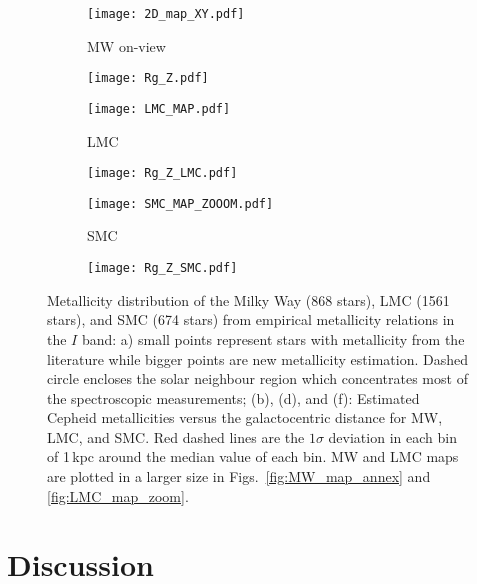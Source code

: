 \documentclass[article]{aa} %
\begin{document}
\begin{figure*} %
\begin{subfigure}{0.50\textwidth}
\texttt{[image: 2D\_map\_XY.pdf]}
\caption{MW on-view} \label{fig:MW_map}
\end{subfigure}\hspace*{\fill}
\begin{subfigure}{0.50\textwidth}
\texttt{[image: Rg\_Z.pdf]}
\caption{} \label{fig:grad_MW}
\end{subfigure}

\medskip
\begin{subfigure}{0.50\textwidth}
\texttt{[image: LMC\_MAP.pdf]}
\caption{LMC} \label{fig:LMC_map}
\end{subfigure}\hspace*{\fill}
\begin{subfigure}{0.50\textwidth}
\texttt{[image: Rg\_Z\_LMC.pdf]}
\caption{} \label{fig:LMC_grad}
\end{subfigure}

\medskip
\begin{subfigure}{0.50\textwidth}
\texttt{[image: SMC\_MAP\_ZOOOM.pdf]}
\caption{SMC} \label{fig:SMC_map}
\end{subfigure}\hspace*{\fill}
\begin{subfigure}{0.50\textwidth}
\texttt{[image: Rg\_Z\_SMC.pdf]}
\caption{} \label{fig:SMC_grad}
\end{subfigure}
\caption{\small Metallicity distribution of the Milky Way (868 stars), LMC (1561 stars), and SMC (674 stars) from empirical metallicity relations in the $I$ band: a) small points represent stars with metallicity from the literature while bigger points are new metallicity estimation. Dashed circle encloses the solar neighbour region which concentrates most of the spectroscopic measurements; (b), (d), and (f): Estimated Cepheid metallicities versus the galactocentric distance for MW, LMC, and SMC. Red dashed lines are the $1\sigma$ deviation in each bin of 1$\,$kpc around the median value of each bin. MW and LMC maps are plotted in a larger size in Figs.~\ref{fig:MW_map_annex} and 
\ref{fig:LMC_map_zoom}.}\label{fig:map}
\end{figure*}



\section{Discussion}\label{sect:discussion}
\end{document}
